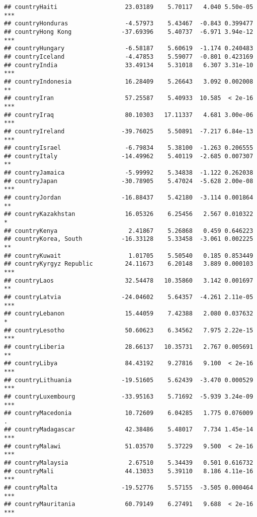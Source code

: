 \documentclass[
  11pt,
]{article}
\begin{document}
\begin{verbatim}
## countryHaiti                   23.03189    5.70117   4.040 5.50e-05 ***
## countryHonduras                -4.57973    5.43467  -0.843 0.399477    
## countryHong Kong              -37.69396    5.40737  -6.971 3.94e-12 ***
## countryHungary                 -6.58187    5.60619  -1.174 0.240483    
## countryIceland                 -4.47853    5.59077  -0.801 0.423169    
## countryIndia                   33.49134    5.31018   6.307 3.31e-10 ***
## countryIndonesia               16.28409    5.26643   3.092 0.002008 ** 
## countryIran                    57.25587    5.40933  10.585  < 2e-16 ***
## countryIraq                    80.10303   17.11337   4.681 3.00e-06 ***
## countryIreland                -39.76025    5.50891  -7.217 6.84e-13 ***
## countryIsrael                  -6.79834    5.38100  -1.263 0.206555    
## countryItaly                  -14.49962    5.40119  -2.685 0.007307 ** 
## countryJamaica                 -5.99992    5.34838  -1.122 0.262038    
## countryJapan                  -30.78905    5.47024  -5.628 2.00e-08 ***
## countryJordan                 -16.88437    5.42180  -3.114 0.001864 ** 
## countryKazakhstan              16.05326    6.25456   2.567 0.010322 *  
## countryKenya                    2.41867    5.26868   0.459 0.646223    
## countryKorea, South           -16.33128    5.33458  -3.061 0.002225 ** 
## countryKuwait                   1.01705    5.50540   0.185 0.853449    
## countryKyrgyz Republic         24.11673    6.20148   3.889 0.000103 ***
## countryLaos                    32.54478   10.35860   3.142 0.001697 ** 
## countryLatvia                 -24.04602    5.64357  -4.261 2.11e-05 ***
## countryLebanon                 15.44059    7.42388   2.080 0.037632 *  
## countryLesotho                 50.60623    6.34562   7.975 2.22e-15 ***
## countryLiberia                 28.66137   10.35731   2.767 0.005691 ** 
## countryLibya                   84.43192    9.27816   9.100  < 2e-16 ***
## countryLithuania              -19.51605    5.62439  -3.470 0.000529 ***
## countryLuxembourg             -33.95163    5.71692  -5.939 3.24e-09 ***
## countryMacedonia               10.72609    6.04285   1.775 0.076009 .  
## countryMadagascar              42.38486    5.48017   7.734 1.45e-14 ***
## countryMalawi                  51.03570    5.37229   9.500  < 2e-16 ***
## countryMalaysia                 2.67510    5.34439   0.501 0.616732    
## countryMali                    44.13033    5.39110   8.186 4.11e-16 ***
## countryMalta                  -19.52776    5.57155  -3.505 0.000464 ***
## countryMauritania              60.79149    6.27491   9.688  < 2e-16 ***

\end{verbatim}
\end{document}
